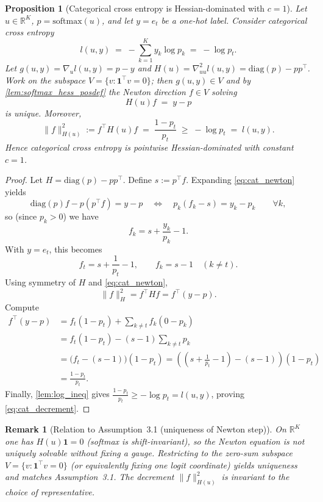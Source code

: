 \documentclass{article}
\theoremstyle{plain}
\newtheorem{proposition}[theorem]{Proposition}
\newtheorem{remark}[theorem]{Remark} %
\theoremstyle{definition}
\theoremstyle{remark}
\begin{document}
\begin{proposition}[Categorical cross entropy is Hessian-dominated with $c=1$]
\label{prop:categorical_ce_hessdom}
Let $u\in\mathbb{R}^K$, $p=\mathrm{softmax}(u)$, and let $y=e_t$ be a one-hot label.
Consider categorical cross entropy
\[
l(u,y) \;=\; -\sum_{k=1}^K y_k\log p_k \;=\; -\log p_t.
\]
Let $g(u,y)=\nabla_u l(u,y)=p-y$ and $H(u)=\nabla^2_{uu}l(u,y)=\mathrm{diag}(p)-pp^\top$.
Work on the subspace $V=\{v:\mathbf{1}^\top v=0\}$; then $g(u,y)\in V$ and by
\cref{lem:softmax_hess_posdef} the Newton direction $f\in V$ solving
\begin{equation}
\label{eq:cat_newton}
H(u)f \;=\; y-p
\end{equation}
is unique. Moreover,
\begin{equation}
\label{eq:cat_decrement}
\|f\|_{H(u)}^2 := f^\top H(u)f
\;=\; \frac{1-p_t}{p_t}
\;\ge\; -\log p_t \;=\; l(u,y).
\end{equation}
Hence categorical cross entropy is pointwise Hessian-dominated with constant $c=1$.
\end{proposition}

\begin{proof}
Let $H=\mathrm{diag}(p)-pp^\top$. Define $s:=p^\top f$. Expanding \eqref{eq:cat_newton} yields
\[
\mathrm{diag}(p)f - p(p^\top f)=y-p
\quad\Longleftrightarrow\quad
p_k(f_k-s)=y_k-p_k\qquad \forall k,
\]
so (since $p_k>0$) we have
\[
f_k = s + \frac{y_k}{p_k} - 1.
\]
With $y=e_t$, this becomes
\[
f_t = s + \frac{1}{p_t}-1,\qquad f_k=s-1\quad(k\neq t).
\]
Using symmetry of $H$ and \eqref{eq:cat_newton},
\[
\|f\|_H^2=f^\top H f = f^\top (y-p).
\]
Compute
\begin{align*}
f^\top (y-p)
&= f_t(1-p_t) + \sum_{k\neq t} f_k(0-p_k) \\
&= f_t(1-p_t) - (s-1)\sum_{k\neq t}p_k \\
&= \big(f_t-(s-1)\big)(1-p_t)
= \left(\left(s+\frac{1}{p_t}-1\right)-(s-1)\right)(1-p_t) \\
&= \frac{1-p_t}{p_t}.
\end{align*}
Finally, \cref{lem:log_ineq} gives $\frac{1-p_t}{p_t}\ge -\log p_t=l(u,y)$,
proving \eqref{eq:cat_decrement}.
\end{proof}

\begin{remark}[Relation to Assumption~3.1 (uniqueness of Newton step)]
\label{rem:cat_uniqueness}
On $\mathbb{R}^K$ one has $H(u)\mathbf{1}=0$ (softmax is shift-invariant), so the
Newton equation is not uniquely solvable without fixing a gauge. Restricting to the
zero-sum subspace $V=\{v:\mathbf{1}^\top v=0\}$ (or equivalently fixing one logit
coordinate) yields uniqueness and matches Assumption~3.1.
The decrement $\|f\|_{H(u)}^2$ is invariant to the choice of representative.
\end{remark}
\end{document}
